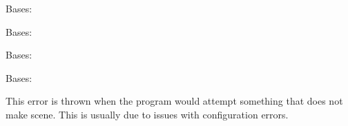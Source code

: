 \documentclass[letterpaper,10pt,english]{sphinxmanual}
\begin{document}

\begin{fulllineitems}
\label{\detokenize{docstrings/ifa_smeargle.core.error:ifa_smeargle.core.error.Ifas_BaseException}}
Bases: 

\end{fulllineitems}


\begin{fulllineitems}
\label{\detokenize{docstrings/ifa_smeargle.core.error:ifa_smeargle.core.error.Ifas_Exception}}
Bases: 

\end{fulllineitems}


\begin{fulllineitems}
\label{\detokenize{docstrings/ifa_smeargle.core.error:ifa_smeargle.core.error.Ifas_Warning}}
Bases: 

\end{fulllineitems}


\begin{fulllineitems}
\label{\detokenize{docstrings/ifa_smeargle.core.error:ifa_smeargle.core.error.IllogicalProsedureError}}
Bases: {\hyperref[\detokenize{docstrings/ifa_smeargle.core.error:ifa_smeargle.core.error.Ifas_Exception}]{}}

This error is thrown when the program would attempt something
that does not make scene. This is usually due to issues with
configuration errors.

\end{fulllineitems}
\end{document}
